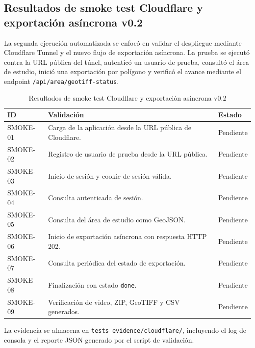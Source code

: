 
\subsection{Resultados de smoke test Cloudflare y exportación asíncrona v0.2}

La segunda ejecución automatizada se enfocó en validar el despliegue mediante Cloudflare
Tunnel y el nuevo flujo de exportación asíncrona. La prueba se ejecutó contra la URL pública
del túnel, autenticó un usuario de prueba, consultó el área de estudio, inició una exportación
por polígono y verificó el avance mediante el endpoint \texttt{/api/area/geotiff-status}.

\begin{table}[H]
\centering
\begin{tabular}{|p{2.7cm}|p{7.7cm}|p{2.5cm}|}
\hline
\textbf{ID} & \textbf{Validación} & \textbf{Estado} \\
\hline
SMOKE-01 & Carga de la aplicación desde la URL pública de Cloudflare. & Pendiente \\
\hline
SMOKE-02 & Registro de usuario de prueba desde la URL pública. & Pendiente \\
\hline
SMOKE-03 & Inicio de sesión y cookie de sesión válida. & Pendiente \\
\hline
SMOKE-04 & Consulta autenticada de sesión. & Pendiente \\
\hline
SMOKE-05 & Consulta del área de estudio como GeoJSON. & Pendiente \\
\hline
SMOKE-06 & Inicio de exportación asíncrona con respuesta HTTP 202. & Pendiente \\
\hline
SMOKE-07 & Consulta periódica del estado de exportación. & Pendiente \\
\hline
SMOKE-08 & Finalización con estado \texttt{done}. & Pendiente \\
\hline
SMOKE-09 & Verificación de video, ZIP, GeoTIFF y CSV generados. & Pendiente \\
\hline
\end{tabular}
\caption{Resultados de smoke test Cloudflare y exportación asíncrona v0.2}
\end{table}

La evidencia se almacena en \texttt{tests\_evidence/cloudflare/}, incluyendo el log de consola
y el reporte JSON generado por el script de validación.
